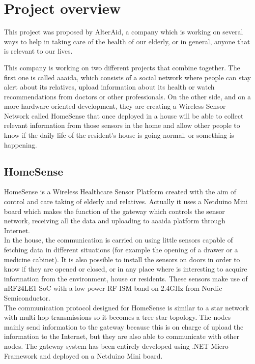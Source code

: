\chapter{Project overview}\label{C:project-overview}
This project was proposed by AlterAid, a company which is working on several ways to help in taking care of the health of our elderly, or in general, anyone that is relevant to our lives.

This company is working on two different projects that combine together. The first one is called aaaida, which consists of a social network where people can stay alert about its relatives, upload information about its health or watch recommendations from doctors or other professionals. On the other side, and on a more hardware oriented development, they are creating a Wireless Sensor Network called HomeSense that once deployed in a house will be able to collect relevant information from those sensors in the home and allow other people to know if the daily life of the resident's house is going normal, or something is happening.

\section{HomeSense}\label{S:HomeSense}
HomeSense is a Wireless Healthcare Sensor Platform created with the aim of control and care taking of elderly and relatives. Actually it uses a Netduino Mini board which makes the function of the gateway which controls the sensor network, receiving all the data and uploading to aaaida platform through Internet.
\\
In the house, the communication is carried on using little sensors capable of fetching data in different situations (for example the opening of a drawer or a medicine cabinet). It is also possible to install the sensors on doors in order to know if they are opened or closed, or in any place where is interesting to acquire information from the environment, house or residents. These sensors make use of nRF24LE1 \gls{SoC} with a low-power RF \gls{ISM} band on 2.4GHz from Nordic Semiconductor.
\\
The communication protocol designed for HomeSense is similar to a star network with multi-hop transmissions so it becomes a tree-star topology. The nodes mainly send information to the gateway because this is on charge of upload the information to the Internet, but they are also able to communicate with other nodes. The gateway system has been entirely developed using .NET Micro Framework and deployed on a Netduino Mini board.

